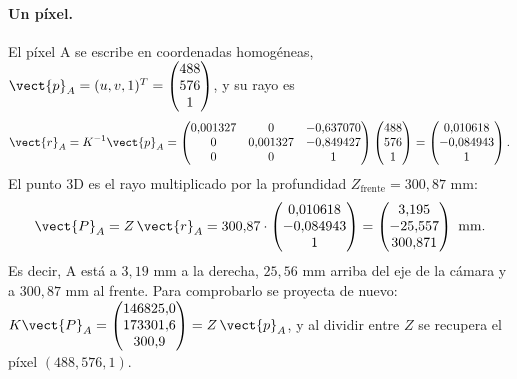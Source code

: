 \paragraph{Un píxel.} El píxel A se escribe en coordenadas homogéneas, $\vect{p}_A=(u,v,1)^T=\begin{pmatrix} 488 \\ 576 \\ 1 \end{pmatrix}$, y su rayo es
\begin{equation}
\vect{r}_A=K^{-1}\vect{p}_A=\begin{pmatrix} 0{,}001327 & 0 & -0{,}637070 \\ 0 & 0{,}001327 & -0{,}849427 \\ 0 & 0 & 1 \end{pmatrix}\begin{pmatrix} 488 \\ 576 \\ 1 \end{pmatrix}=\begin{pmatrix} 0{,}010618 \\ -0{,}084943 \\ 1 \end{pmatrix} .
\end{equation}
El punto 3D es el rayo multiplicado por la profundidad $Z_{\text{frente}}=300{,}87$ mm:
\begin{equation}
\vect{P}_A=Z\,\vect{r}_A=300{,}87\cdot\begin{pmatrix} 0{,}010618 \\ -0{,}084943 \\ 1 \end{pmatrix}=\begin{pmatrix} 3{,}195 \\ -25{,}557 \\ 300{,}871 \end{pmatrix}\ \text{mm}.
\end{equation}
Es decir, A está a $3{,}19$ mm a la derecha, $25{,}56$ mm arriba del eje de la cámara y a $300{,}87$ mm al frente.
Para comprobarlo se proyecta de nuevo: $K\vect{P}_A=\begin{pmatrix} 146825{,}0 \\ 173301{,}6 \\ 300{,}9 \end{pmatrix}=Z\,\vect{p}_A$, y al dividir entre $Z$ se recupera el píxel $(488,576,1)$.

